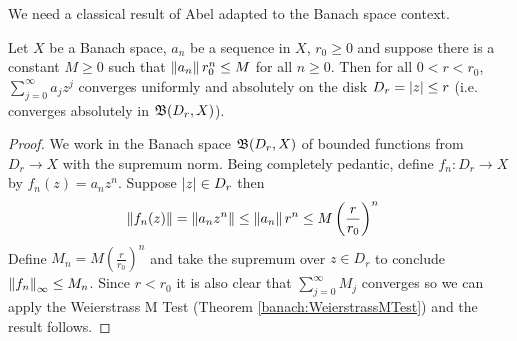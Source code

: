 We need a classical result of Abel adapted to the Banach space
context.
\begin{lem}\label{banach:AbelLemma}Let $X$ be a Banach space, $a_n$ be
  a sequence in $X$, $r_0 \geq 0$ and suppose there is a constant $M
  \geq 0$ such that $\left \lVert a_n \right \rVert r_0^n \leq M$ for all $n \geq 0$.
  Then for all $0 < r < r_0$, $\sum_{j=0}^\infty a_j z^j$ converges
  uniformly and absolutely on the disk $D_r = \left \vert z \right \vert \leq r$
  (i.e. converges absolutely in $\mathfrak{B}(D_r, X)$).
\end{lem}
\begin{proof}
  We work in the Banach space $\mathfrak{B}(D_r, X)$ of bounded functions from $D_r \to X$ with the
  supremum norm.  Being completely pedantic, define $f_n : D_r \to X$
  by $f_n(z) = a_n z^n$.  Suppose $\left \vert z \right \vert \in D_r$ then
  \begin{align*}
    \left \lVert f_n(z) \right \rVert &= \left \lVert a_n z^n \right \rVert \leq \left \lVert a_n \right \rVert r^n \leq M \left(\frac{r}{r_0}\right)^n
  \end{align*}
 Define $M_n = M \left(\frac{r}{r_0}\right)^n$ and take the supremum
 over $z \in D_r$ to conclude $\left \lVert f_n \right \rVert_\infty \leq M_n$.   Since $r
 < r_0$ it is also clear that $\sum_{j=0}^\infty M_j$ converges so we
 can apply the Weierstrass M Test (Theorem \ref{banach:WeierstrassMTest}) and
   the result follows.
 \end{proof}

